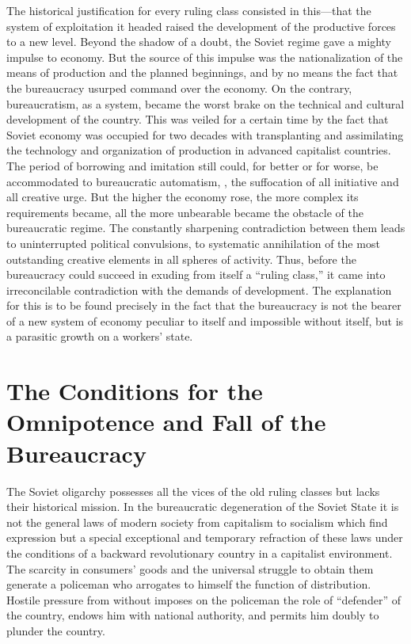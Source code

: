 The historical justification for every ruling class consisted in this---that the system of exploitation it headed raised the development of the productive forces to a new level. Beyond the shadow of a doubt, the Soviet regime gave a mighty impulse to economy. But the source of this impulse was the nationalization of the means of production and the planned beginnings, and by no means the fact that the bureaucracy usurped command over the economy. On the contrary, bureaucratism, as a system, became the worst brake on the technical and cultural development of the country. This was veiled for a certain time by the fact that Soviet economy was occupied for two decades with transplanting and assimilating the technology and organization of production in advanced capitalist countries. The period of borrowing and imitation still could, for better or for worse, be accommodated to bureaucratic automatism, \ie, the suffocation of all initiative and all creative urge. But the higher the economy rose, the more complex its requirements became, all the more unbearable became the obstacle of the bureaucratic regime. The constantly sharpening contradiction between them leads to uninterrupted political convulsions, to systematic annihilation of the most outstanding creative elements in all spheres of activity. Thus, before the bureaucracy could succeed in exuding from itself a “ruling class,” it came into irreconcilable contradiction with the demands of development. The explanation for this is to be found precisely in the fact that the bureaucracy is not the bearer of a new system of economy peculiar to itself and impossible without itself, but is a parasitic growth on a workers’ state.
\nowidow

\section*{The Conditions for the Omnipotence and Fall of the Bureaucracy}

The Soviet oligarchy possesses all the vices of the old ruling classes but lacks their historical mission. In the bureaucratic degeneration of the Soviet State it is not the general laws of modern society from capitalism to socialism which find expression but a special exceptional and temporary refraction of these laws under the conditions of a backward revolutionary country in a capitalist environment. The scarcity in consumers’ goods and the universal struggle to obtain them generate a policeman who arrogates to himself the function of distribution. Hostile pressure from without imposes on the policeman the role of “defender” of the country, endows him with national authority, and permits him doubly to plunder the country.

